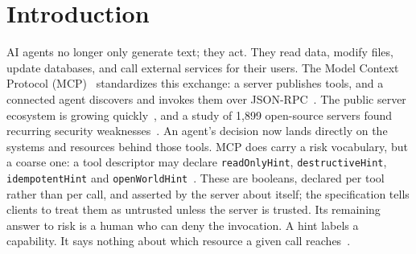%
%
\section{Introduction}
\label{sec:intro}

AI agents no longer only generate text; they act. They read data, modify files,
update databases, and call external services for their users. The Model Context
Protocol (MCP)~\cite{anthropic2024mcp} standardizes this exchange: a server
publishes tools, and a connected agent discovers and invokes them over
JSON-RPC~\cite{mcp2026spec}. The public server ecosystem is growing
quickly~\cite{hou2026mcp}, and a study of 1{,}899 open-source servers found
recurring security weaknesses~\cite{hasan2025firstglance}. An agent's decision
now lands directly on the systems and resources behind those tools. MCP does
carry a risk vocabulary, but a coarse one: a tool descriptor may declare
\texttt{readOnlyHint}, \texttt{destructiveHint}, \texttt{idempotentHint} and
\texttt{openWorldHint}~\cite{mcp2026spec}. These are booleans, declared per tool
rather than per call, and asserted by the server about itself; the specification
tells clients to treat them as untrusted unless the server is trusted. Its
remaining answer to risk is a human who can deny the invocation. A hint labels a
capability. It says nothing about which resource a given call
reaches~\cite{hou2026mcp,buhler2026agentbound}.

